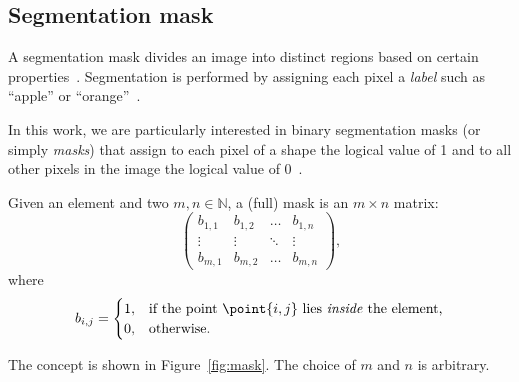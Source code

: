 \subsection{Segmentation mask}

 A segmentation mask divides an image into distinct regions based on certain properties~\cite{agosta_segmentation_mask_visualization, lowe2022segmentation}. Segmentation is performed by assigning each pixel a \emph{label} such as \enquote{apple} or \enquote{orange}~\cite{lowe2022segmentation}.
 
 In this work, we are particularly interested in binary segmentation masks (or simply \emph{masks}) that assign to each pixel of a shape the logical value of 1 and to all other pixels in the image the logical value of 0~\cite{bbox_masks_polygons}.

\begin{definition}
    Given an element and two $m, n \in \mathbb{N}$, a (full) mask is an $m \times n$ matrix:
    \[
        \begin{pmatrix}
            b_{1,1} & b_{1,2} & \dots & b_{1,n} \\
            \vdots & \vdots & \ddots & \vdots \\
            b_{m,1} & b_{m,2} & \dots & b_{m,n}
        \end{pmatrix}
        \text{,}
    \]
    where
    \[
    b_{i,j} = 
    \begin{cases}
        1, & \text{if the point }\point{i, j}\text{ lies \emph{inside} the element,} \\
        0, & \text{otherwise.}
    \end{cases}
    \]

    The concept is shown in Figure~\ref{fig:mask}. The choice of $m$ and $n$ is arbitrary.

    \begin{figure}[H]
        \centering

\end{figure}
\end{definition}
